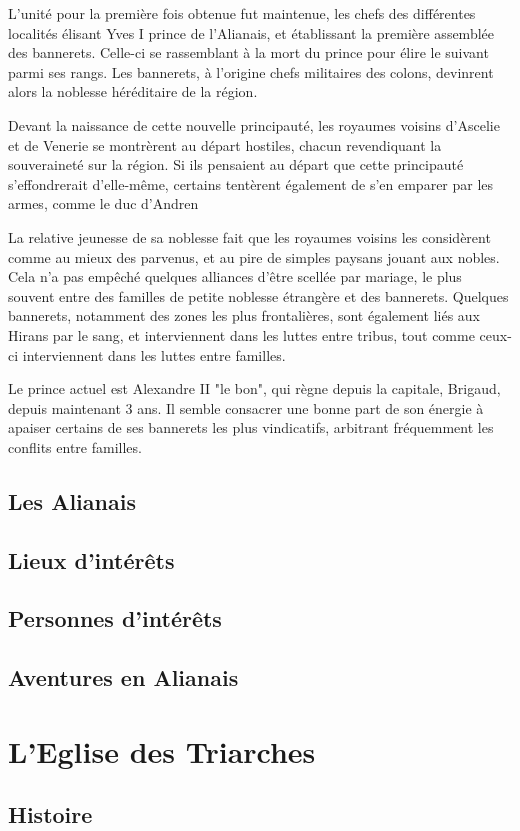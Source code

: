 \documentclass[10pt,a4paper,twocolumn]{book}
\begin{document}
L'unité pour la première fois obtenue fut maintenue, les chefs des différentes localités élisant Yves I prince de l'Alianais, et établissant la première assemblée des bannerets. Celle-ci se rassemblant à la mort du prince pour élire le suivant parmi ses rangs. Les bannerets, à l'origine chefs militaires des colons, devinrent alors la noblesse héréditaire de la région.

Devant la naissance de cette nouvelle principauté, les royaumes voisins d'Ascelie et de Venerie se montrèrent au départ hostiles, chacun revendiquant la souveraineté sur la région. Si ils pensaient au départ que cette principauté s'effondrerait d'elle-même, certains tentèrent également de s'en emparer par les armes, comme le duc d'Andren

La relative jeunesse de sa noblesse fait que les royaumes voisins les considèrent comme au mieux des parvenus, et au pire de simples paysans jouant aux nobles. Cela n'a pas empêché quelques alliances d'être scellée par mariage, le plus souvent entre des familles de petite noblesse étrangère et des bannerets. Quelques bannerets, notamment des zones les plus frontalières, sont également liés aux Hirans par le sang, et interviennent dans les luttes entre tribus, tout comme ceux-ci interviennent dans les luttes entre familles.

Le prince actuel est Alexandre II "le bon", qui règne depuis la capitale, Brigaud, depuis maintenant 3 ans. Il semble consacrer une bonne part de son énergie à apaiser certains de ses bannerets les plus vindicatifs, arbitrant fréquemment les conflits entre familles.
\section{Les Alianais}
\section{Lieux d'intérêts}
\section{Personnes d'intérêts}
\section{Aventures en Alianais}
\chapter{L'Eglise des Triarches}
\section{Histoire}
\end{document}
